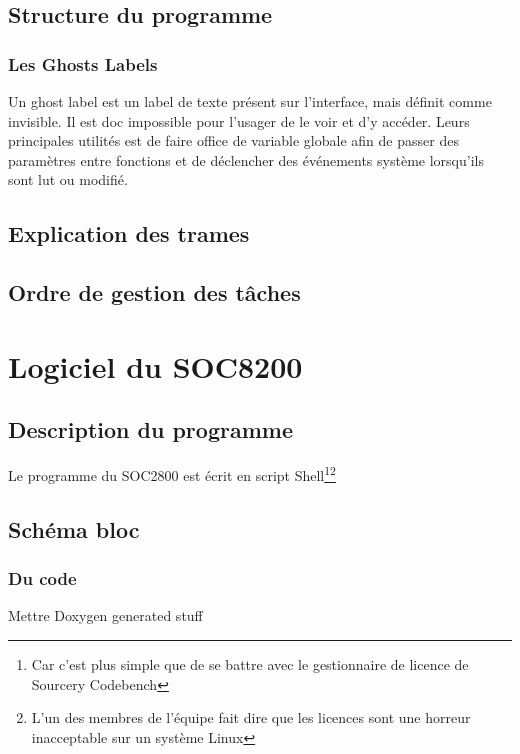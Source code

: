 \documentclass[10pt,a4paper,final]{article}
\begin{document}
\begin{spacing}{1.5}



\subsection{Structure du programme}
\subsubsection{Les Ghosts Labels}
Un ghost label est un label de texte présent sur l'interface, mais définit comme invisible. Il est doc impossible pour l'usager de le voir et d'y accéder. Leurs principales utilités est de faire office de variable globale afin de passer des paramètres entre fonctions et de déclencher des événements système lorsqu'ils sont lut ou modifié.


\subsection{Explication des trames}

\subsection{Ordre de gestion des tâches}





\pagebreak
\section{Logiciel du SOC8200}
\subsection{Description du programme}
Le programme du SOC2800 est écrit en script Shell\footnote{Car c'est plus simple que de se battre avec le gestionnaire de licence de Sourcery Codebench}\footnote{L'un des membres de l'équipe fait dire que les licences sont une horreur inacceptable sur un système Linux}

\subsection{Schéma bloc}

\subsubsection{Du code}
Mettre Doxygen generated stuff


\end{spacing}
\end{document}
